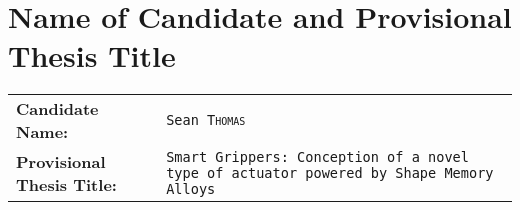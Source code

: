 \section{Name of Candidate and Provisional Thesis Title}\label{sec:name_title}
\noindent
\begin{tabularx}{\textwidth}{l X}
\textbf{Candidate Name:} &\texttt{Sean \textsc{Thomas} }\\
\textbf{Provisional Thesis Title:} &\texttt{Smart Grippers: Conception of a novel type of actuator powered by Shape Memory Alloys}
\end{tabularx}
